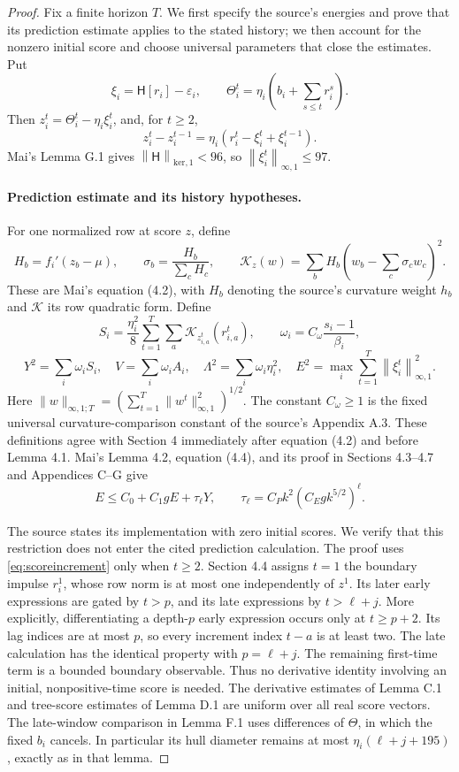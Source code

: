 \documentclass[11pt]{article}
\newcommand{\norm}[1]{\left\lVert#1\right\rVert}
\newcommand{\rn}[1]{\norm{#1}_{\infty,1}}
\newcommand{\Pred}{\mathsf H}
\begin{document}
\begin{proof}
Fix a finite horizon $T$.  We first specify the source's energies and
prove that its prediction estimate applies to the stated history;
we then account for the nonzero initial score and choose universal
parameters that close the estimates.  Put
\[
 \xi_i=\Pred[r_i]-\varepsilon_i,\qquad
 \Theta_i^t=\eta_i\left(b_i+\sum_{s\leq t}r_i^s\right).
\]
Then $z_i^t=\Theta_i^t-\eta_i\xi_i^t$, and, for $t\geq2$,
\begin{equation}\label{eq:scoreincrement}
 z_i^t-z_i^{t-1}
 =\eta_i(r_i^t-\xi_i^t+\xi_i^{t-1}).
\end{equation}
Mai's Lemma G.1 gives $\norm{\Pred}_{\mathrm{ker},1}<96$, so
$\rn{\xi_i^t}\leq97$.

\paragraph{Prediction estimate and its history hypotheses.}
For one normalized row at score $z$, define
\[
 H_b=f_i'(z_b-\mu),\qquad
 \sigma_b=\frac{H_b}{\sum_cH_c},\qquad
 \mathcal K_z(w)=\sum_bH_b
 \left(w_b-\sum_c\sigma_cw_c\right)^2.
\]
These are Mai's equation (4.2), with $H_b$ denoting the source's
curvature weight $h_b$ and $\mathcal K$ its row quadratic form.
Define
\[
 S_i=\frac{\eta_i^2}{8}\sum_{t=1}^T\sum_a
       \mathcal K_{z_{i,a}^t}(r_{i,a}^t),\qquad
 \omega_i=C_\omega\frac{s_i-1}{\beta_i},
\]
\[
 Y^2=\sum_i\omega_iS_i,\quad V=\sum_i\omega_iA_i,
 \quad\Lambda^2=\sum_i\omega_i\eta_i^2,\quad
 E^2=\max_i\sum_{t=1}^T\rn{\xi_i^t}^2.
\]
Here $\|w\|_{\infty,1;T}=(\sum_{t=1}^T\|w^t\|_{\infty,1}^2)^{1/2}$.
The constant $C_\omega\geq1$ is the fixed universal curvature-comparison
constant of the source's Appendix A.3.  These definitions agree
with Section 4 immediately after equation (4.2) and before Lemma 4.1.
Mai's Lemma 4.2, equation (4.4), and its proof in Sections 4.3--4.7
and Appendices C--G give
\begin{equation}\label{eq:prediction}
 E\leq C_0+C_1gE+\tau_\ell Y,
 \qquad\tau_\ell=C_Pk^2(C_Egk^{5/2})^\ell.
\end{equation}

The source states its implementation with zero initial scores.  We
verify that this restriction does not enter the cited prediction
calculation.  The proof uses \eqref{eq:scoreincrement} only when
$t\geq2$.  Section 4.4 assigns $t=1$ the boundary impulse $r_i^1$,
whose row norm is at most one independently of $z^1$.  Its later early
expressions are gated by $t>p$, and its late expressions by
$t>\ell+j$.  More explicitly, differentiating a depth-$p$ early
expression occurs only at $t\geq p+2$.  Its lag indices are at most
$p$, so every increment index $t-a$ is at least two.  The late
calculation has the identical property with $p=\ell+j$.  The remaining
first-time term is a bounded boundary observable.  Thus no derivative
identity involving an initial, nonpositive-time score is needed.
The derivative estimates of Lemma C.1 and tree-score estimates of
Lemma D.1 are uniform over all real score vectors.  The late-window
comparison in Lemma F.1 uses differences of $\Theta$, in which the
fixed $b_i$ cancels.  In particular its hull diameter remains at most
$\eta_i(\ell+j+195)$, exactly as in that lemma.


\end{proof}
\end{document}
